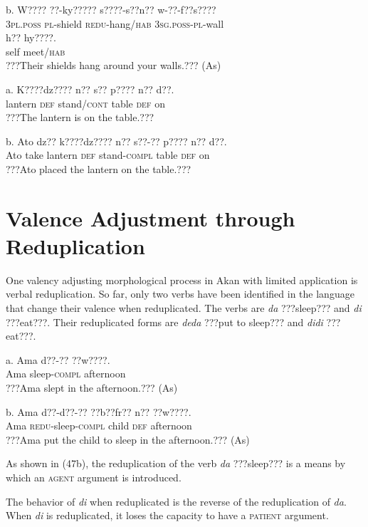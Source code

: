 \documentclass[output=paper]{langsci/langscibook}
\begin{document}
\ea
\gll  b.  W????    ??-ky?????    s????-s??n??     w-??-f??s???? \\
       \textsc{3pl.poss}  \textsc{pl}{}-shield  \textsc{redu}{}-hang/\textsc{hab}  \textsc{3sg.poss-pl}{}-wall\\
\gll   h??  hy????.\\
       self  meet/\textsc{hab}\\
\glt ???Their shields hang around your walls.??? (As)
\z

\ea
\gll a.  K????dz????  n??  s??    p????  n??  d??.\\
       lantern    \textsc{def}  stand/\textsc{cont}  table  \textsc{def}  on\\
\glt ???The lantern is on the table.???
\z

\ea
\gll  b.  Ato  dz??  k????dz????  n??  s??-??    p????  n??  d??.\\
       Ato  take  lantern    \textsc{def}  stand-\textsc{compl}  table  \textsc{def}  on\\
\glt ???Ato placed the lantern on the table.???
\z

\section{Valence Adjustment through Reduplication  }

One valency adjusting morphological process in Akan with limited application is verbal reduplication. So far, only two verbs have been identified in the language that change their valence when reduplicated. The verbs are \emph{da} ???sleep??? and \emph{di} ???eat???. Their reduplicated forms are \emph{deda} ???put to sleep??? and \emph{didi} ???eat???.


\ea
\gll a.  Ama  d??-??    ??w????.\\
       Ama  sleep-\textsc{compl}  afternoon\\
\glt   ???Ama slept in the afternoon.??? (As)
\z

\ea
\gll  b.  Ama  d??-d??-??    ??b??fr??    n??  ??w????.\\
       Ama  \textsc{redu}{}-sleep\textsc{{}-compl}  child    \textsc{def}  afternoon\\
\glt   ???Ama put the child to sleep in the afternoon.??? (As)
\z

As shown in (47b), the reduplication of the verb \emph{da} ???sleep??? is a means by which an \textsc{agent} argument is introduced.

The behavior of \emph{di} when reduplicated is the reverse of the reduplication of \emph{da}. When \emph{di} is reduplicated, it loses the capacity to have a \textsc{patient} argument.
\end{document}
